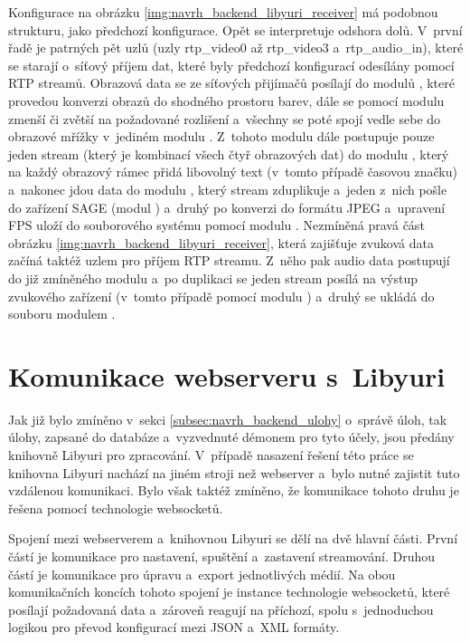 \documentclass[thesis=M,czech]{FITthesis}[2012/06/26]
\begin{document}
Konfigurace na obrázku \ref{img:navrh_backend_libyuri_receiver} má podobnou strukturu, jako předchozí konfigurace. Opět se interpretuje odshora dolů. V~první řadě je patrných pět uzlů (uzly rtp\_video0 až rtp\_video3 a~rtp\_audio\_in), které se starají o~síťový příjem dat, které byly předchozí konfigurací odesílány pomocí RTP streamů. Obrazová data se ze síťových přijímačů posílají do modulů , které provedou konverzi obrazů do shodného prostoru barev, dále se pomocí modulu  zmenší či zvětší na požadované rozlišení a~všechny se poté spojí vedle sebe do obrazové mřížky v~jediném modulu . Z~tohoto modulu dále postupuje pouze jeden stream (který je kombinací všech čtyř obrazových dat) do modulu , který na každý obrazový rámec přidá libovolný text (v~tomto případě časovou značku) a~nakonec jdou data do modulu , který stream zduplikuje a~jeden z~nich pošle do zařízení SAGE (modul ) a~druhý po konverzi do formátu JPEG a~upravení FPS uloží do souborového systému pomocí modulu . Nezmíněná pravá část obrázku \ref{img:navrh_backend_libyuri_receiver}, která zajišťuje zvuková data začíná taktéž uzlem pro příjem RTP streamu. Z~něho pak audio data postupují do již zmíněného modulu  a~po duplikaci se jeden stream posílá na výstup zvukového zařízení (v~tomto případě pomocí modulu ) a~druhý se ukládá do souboru modulem .

\section{Komunikace webserveru s~Libyuri} \label{sec:navrh_communication}
Jak již bylo zmíněno v~sekci \ref{subsec:navrh_backend_ulohy} o~správě úloh, tak úlohy, zapsané do databáze a~vyzvednuté démonem pro tyto účely, jsou předány knihovně Libyuri pro zpracování. V~případě nasazení řešení této práce se knihovna Libyuri nachází na jiném stroji než webserver a~bylo nutné zajistit tuto vzdálenou komunikaci. Bylo však taktéž zmíněno, že komunikace tohoto druhu je řešena pomocí technologie websocketů. 

Spojení mezi webserverem a~knihovnou Libyuri se dělí na dvě hlavní části. První částí je komunikace pro nastavení, spuštění a~zastavení streamování. Druhou částí je komunikace pro úpravu a~export jednotlivých médií. Na obou komunikačních koncích tohoto spojení je instance technologie websocketů, které posílají požadovaná data a~zároveň reagují na příchozí, spolu s~jednoduchou logikou pro převod konfigurací mezi JSON a~XML formáty. 
\end{document}
